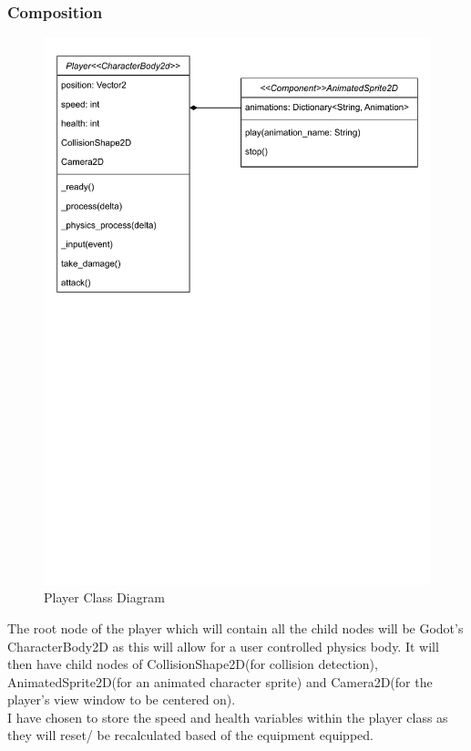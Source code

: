 \documentclass{article}
\begin{document}
        \subsubsection{Composition}
        \begin{figure}[H]
                \centering
                \includegraphics[width = 0.9\columnwidth, clip, trim = 0 450 0 0]{images/design/Player_Class_Diagram.pdf}
                \caption{Player Class Diagram}
        \end{figure}
        The root node of the player which will contain all the child nodes will be Godot's CharacterBody2D as this will allow for a user controlled physics body. It will then have child nodes of CollisionShape2D(for collision detection), AnimatedSprite2D(for an animated character sprite) and Camera2D(for the player's view window to be centered on).\\
        I have chosen to store the speed and health variables within the player class as they will reset/ be recalculated based of the equipment equipped.\\
\end{document}
